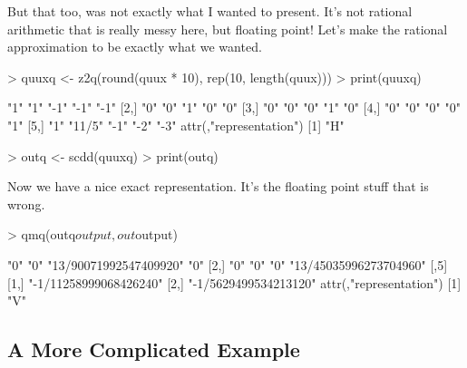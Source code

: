 \documentclass{article}
\begin{document}
But that too, was not exactly what I wanted to present.
It's not rational arithmetic that is really messy here,
but floating point!  Let's make the rational approximation
to be exactly what we wanted.
\begin{Schunk}
\begin{Sinput}
> quuxq <- z2q(round(quux * 10), rep(10, length(quux)))
> print(quuxq)
\end{Sinput}
\begin{Soutput}
     [,1] [,2]   [,3] [,4] [,5]
[1,] "1"  "1"    "-1" "-1" "-1"
[2,] "0"  "0"    "1"  "0"  "0" 
[3,] "0"  "0"    "0"  "1"  "0" 
[4,] "0"  "0"    "0"  "0"  "1" 
[5,] "1"  "11/5" "-1" "-2" "-3"
attr(,"representation")
[1] "H"
\end{Soutput}
\begin{Sinput}
> outq <- scdd(quuxq)
> print(outq)
\end{Sinput}
\end{Schunk}
Now we have a nice exact representation.  It's the floating
point stuff that is wrong.
\begin{Schunk}
\begin{Sinput}
> qmq(outq$output, out$output)
\end{Sinput}
\begin{Soutput}
     [,1] [,2] [,3]                   [,4]                  
[1,] "0"  "0"  "13/90071992547409920" "0"                   
[2,] "0"  "0"  "0"                    "13/45035996273704960"
     [,5]                  
[1,] "-1/11258999068426240"
[2,] "-1/5629499534213120" 
attr(,"representation")
[1] "V"
\end{Soutput}
\end{Schunk}

\subsection{A More Complicated Example}
\end{document}
